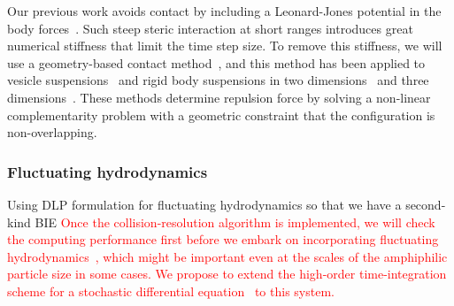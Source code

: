 Our previous work avoids contact by including a Leonard-Jones potential
in the body forces~\cite{Fu2018_SIAM}. Such steep steric interaction at
short ranges introduces great numerical stiffness that limit the time
step size. To remove this stiffness, we will use a geometry-based
contact method~\cite{har-pon-sor-zor2011}, and this method has been
applied to vesicle suspensions~\cite{lu-rah-zor2017} and rigid body
suspensions in two dimensions~\cite{bys-sha-qua2020} and
three dimensions~\cite{Yan2019}. These methods determine repulsion
force by solving a non-linear complementarity problem with a geometric
constraint that the configuration is non-overlapping.


\subsubsection{Fluctuating hydrodynamics}
\label{subsec:fluctuating}
Using DLP formulation for fluctuating hydrodynamics so that we have a
second-kind BIE
\textcolor{red}{
Once the collision-resolution algorithm is implemented, we will check
the computing performance first before we embark on incorporating
fluctuating hydrodynamics~\cite{Bao17,Bao18}, which might be important
even at the scales of the amphiphilic particle size in some cases. We
propose to extend the high-order time-integration scheme for a
stochastic differential equation~\cite{fu2015pre} to this system.
}




